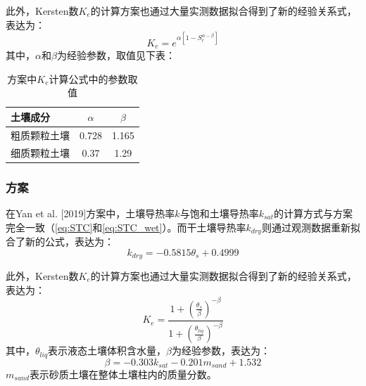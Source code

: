 此外，Kersten数$K_e$的计算方案也通过大量实测数据拟合得到了新的经验关系式，表达为：$$K_e=e^{\alpha\left[1-S_r^{\alpha-\beta}\right]}$$
其中，$\alpha$和$\beta$为经验参数，取值见下表：
\begin{table}[htbp]
    \centering
    \caption{\citet{lu2007improved}方案中$K_e$计算公式中的参数取值}
    \begin{tabular}{@{}lcc@{}}
    \toprule
    土壤成分               & $\alpha$     & $\beta$  \\
    \midrule
    粗质颗粒土壤                  & 0.728      & 1.165  \\
    细质颗粒土壤                  & 0.37    & 1.29   \\
    \bottomrule
    \end{tabular}
\end{table}

\subsubsection{\citet{Yan2019thermal}方案}
在Yan et al. [2019]方案中，土壤导热率$k$与饱和土壤导热率$k_{sat}$的计算方式与\citet{Johansen1975}方案完全一致（\ref{eq:STC}和\ref{eq:STC_wet}）。而干土壤导热率$k_{dry}$则通过观测数据重新拟合了新的公式，表达为：
\begin{equation}\label{eq:STC_dry_Yan}
k_{dry}=-0.5815\theta_s + 0.4999
\end{equation}

此外，Kersten数$K_e$的计算方案也通过大量实测数据拟合得到了新的经验关系式，表达为：$$K_e=\frac{1+\left(\frac{\theta_s}{\beta}\right)^{-\beta}}{1+\left(\frac{\theta_{liq}}{\beta}\right)^{-\beta}}$$
其中，$\theta_{liq}$表示液态土壤体积含水量，$\beta$为经验参数，表达为：$$\beta = -0.303k_{sat} - 0.201m_{sand} + 1.532$$
$m_{sand}$表示砂质土壤在整体土壤柱内的质量分数。

